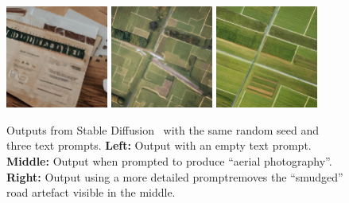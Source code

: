 \begin{figure}[t]
    \centering
    \includegraphics[width=0.3\textwidth]{figs/2sdm/sd_uncond.png}
    \hfill
    \includegraphics[width=0.3\textwidth]{figs/2sdm/uncond-aerial-photo.jpg}
    \hfill
    \includegraphics[width=0.3\textwidth]{figs/2sdm/cond-aerial-photo.jpg}
    \caption{Outputs from Stable Diffusion~\citep{rombach2022high} with the same random seed and three text prompts. \textbf{Left:} Output with an empty text prompt. \textbf{Middle:} Output when prompted to produce ``aerial photography''. \textbf{Right:} Output using a more detailed prompt\protect\footnotemark removes the ``smudged'' road artefact visible in the middle.}
    \label{fig:stable-diffusion-example}
\end{figure}


